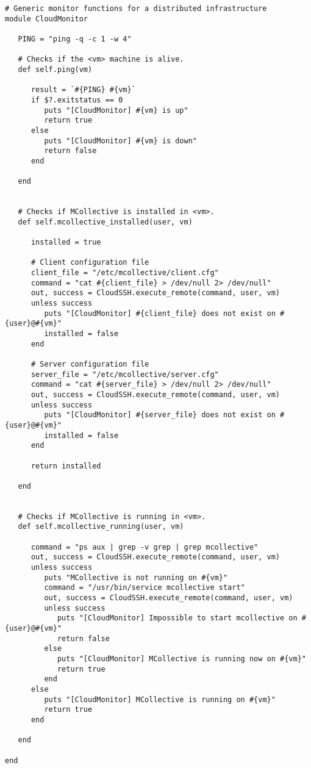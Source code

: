 \begin{lstlisting}
# Generic monitor functions for a distributed infrastructure
module CloudMonitor

   PING = "ping -q -c 1 -w 4"

   # Checks if the <vm> machine is alive.
   def self.ping(vm)

      result = `#{PING} #{vm}`
      if $?.exitstatus == 0
         puts "[CloudMonitor] #{vm} is up"
         return true
      else
         puts "[CloudMonitor] #{vm} is down"
         return false
      end
      
   end


   # Checks if MCollective is installed in <vm>.
   def self.mcollective_installed(user, vm)
      
      installed = true
      
      # Client configuration file
      client_file = "/etc/mcollective/client.cfg"
      command = "cat #{client_file} > /dev/null 2> /dev/null"
      out, success = CloudSSH.execute_remote(command, user, vm)
      unless success
         puts "[CloudMonitor] #{client_file} does not exist on #{user}@#{vm}"
         installed = false
      end

      # Server configuration file
      server_file = "/etc/mcollective/server.cfg"
      command = "cat #{server_file} > /dev/null 2> /dev/null"
      out, success = CloudSSH.execute_remote(command, user, vm)
      unless success
         puts "[CloudMonitor] #{server_file} does not exist on #{user}@#{vm}"
         installed = false
      end
      
      return installed
      
   end


   # Checks if MCollective is running in <vm>.
   def self.mcollective_running(user, vm)
      
      command = "ps aux | grep -v grep | grep mcollective"
      out, success = CloudSSH.execute_remote(command, user, vm)
      unless success
         puts "MCollective is not running on #{vm}"
         command = "/usr/bin/service mcollective start"
         out, success = CloudSSH.execute_remote(command, user, vm)
         unless success
            puts "[CloudMonitor] Impossible to start mcollective on #{user}@#{vm}"
            return false
         else
            puts "[CloudMonitor] MCollective is running now on #{vm}"
            return true
         end
      else
         puts "[CloudMonitor] MCollective is running on #{vm}"
         return true
      end
      
   end
   
end
\end{lstlisting}


